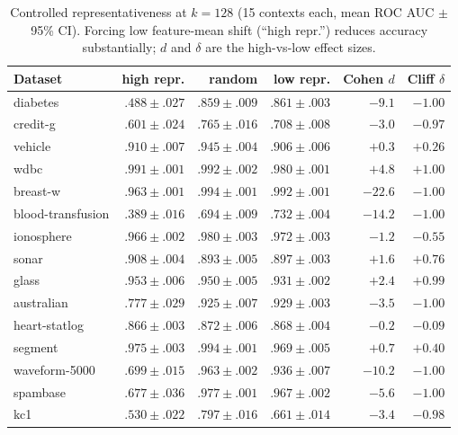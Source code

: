 \documentclass[11pt,a4paper]{article}
\begin{document}
\begin{table}[h]
\centering
\caption{Controlled representativeness at $k{=}128$ (15 contexts each, mean ROC
AUC $\pm$ 95\% CI). Forcing low feature-mean shift (``high repr.'') reduces
accuracy substantially; $d$ and $\delta$ are the high-vs-low effect sizes.}
\label{tab:controlled}
\begin{tabular}{lrrrrr}
\toprule
Dataset & high repr. & random & low repr. & Cohen $d$ & Cliff $\delta$ \\
\midrule
diabetes           & $.488{\pm}.027$ & $.859{\pm}.009$ & $.861{\pm}.003$ & $-9.1$ & $-1.00$ \\
credit-g           & $.601{\pm}.024$ & $.765{\pm}.016$ & $.708{\pm}.008$ & $-3.0$ & $-0.97$ \\
vehicle            & $.910{\pm}.007$ & $.945{\pm}.004$ & $.906{\pm}.006$ & $+0.3$ & $+0.26$ \\
wdbc               & $.991{\pm}.001$ & $.992{\pm}.002$ & $.980{\pm}.001$ & $+4.8$ & $+1.00$ \\
breast-w           & $.963{\pm}.001$ & $.994{\pm}.001$ & $.992{\pm}.001$ & $-22.6$ & $-1.00$ \\
blood-transfusion  & $.389{\pm}.016$ & $.694{\pm}.009$ & $.732{\pm}.004$ & $-14.2$ & $-1.00$ \\
ionosphere         & $.966{\pm}.002$ & $.980{\pm}.003$ & $.972{\pm}.003$ & $-1.2$ & $-0.55$ \\
sonar              & $.908{\pm}.004$ & $.893{\pm}.005$ & $.897{\pm}.003$ & $+1.6$ & $+0.76$ \\
glass              & $.953{\pm}.006$ & $.950{\pm}.005$ & $.931{\pm}.002$ & $+2.4$ & $+0.99$ \\
australian         & $.777{\pm}.029$ & $.925{\pm}.007$ & $.929{\pm}.003$ & $-3.5$ & $-1.00$ \\
heart-statlog      & $.866{\pm}.003$ & $.872{\pm}.006$ & $.868{\pm}.004$ & $-0.2$ & $-0.09$ \\
segment            & $.975{\pm}.003$ & $.994{\pm}.001$ & $.969{\pm}.005$ & $+0.7$ & $+0.40$ \\
waveform-5000      & $.699{\pm}.015$ & $.963{\pm}.002$ & $.936{\pm}.007$ & $-10.2$ & $-1.00$ \\
spambase           & $.677{\pm}.036$ & $.977{\pm}.001$ & $.967{\pm}.002$ & $-5.6$ & $-1.00$ \\
kc1                & $.530{\pm}.022$ & $.797{\pm}.016$ & $.661{\pm}.014$ & $-3.4$ & $-0.98$ \\
\bottomrule
\end{tabular}
\end{table}
\end{document}

